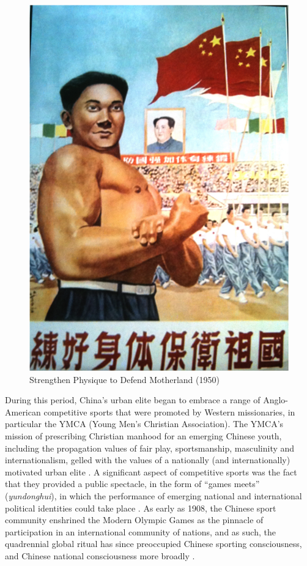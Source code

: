 \begin{figure}[htbp]
  \includegraphics[width = \linewidth]{images/motherlandStrength.png}
  \caption{Strengthen Physique to Defend Motherland (1950)}
  \label{fig:motherlandStrength}
\end{figure}

During this period, China's urban elite began to embrace a range of Anglo-American competitive sports that were promoted by Western missionaries, in particular the YMCA (Young Men's Christian Association).  The YMCA's mission of prescribing Christian manhood for an emerging Chinese youth, including the propagation values of fair play, sportsmanship, masculinity and internationalism, gelled with the values of a nationally (and internationally) motivated urban elite \citep[240]{Morris2004}.  A significant aspect of competitive sports was the fact that they provided a public spectacle, in the form of ``games meets'' (\textit{yundonghui}), in which the performance of emerging national and international political identities could take place \citep{Brownell2008}.
As early as 1908, the Chinese sport community enshrined the Modern Olympic Games as the pinnacle of participation in an international community of nations, and as such, the quadrennial global ritual has since preoccupied Chinese sporting consciousness, and Chinese national consciousness more broadly \cites{Jarvie2008}{Barme2009}[19]{Brownell2008}[3]{Morris2004}{Xu2010}.


